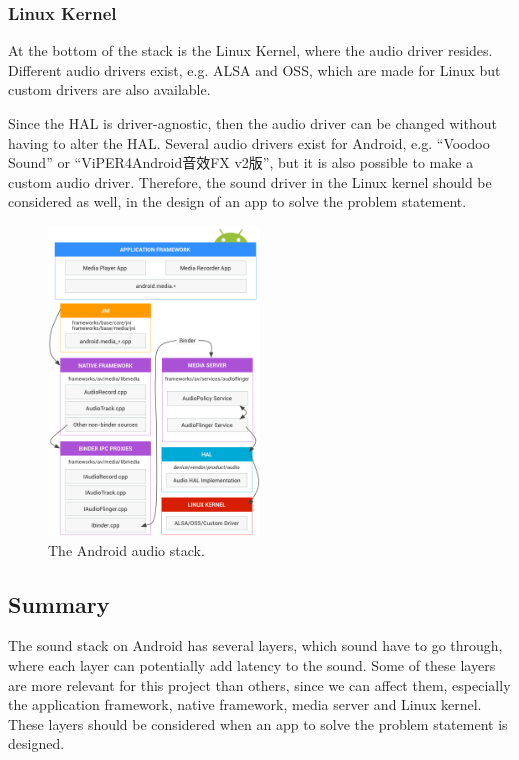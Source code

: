 \subsubsection*{Linux Kernel}
At the bottom of the stack is the Linux Kernel, where the audio driver resides.
Different audio drivers exist, e.g. \ac{ALSA} and \ac{OSS}, which are made for Linux but custom drivers are also available.

Since the \ac{HAL} is driver-agnostic, then the audio driver can be changed without having to alter the \ac{HAL}.
Several audio drivers exist for Android, e.g. ``Voodoo Sound'' or ``ViPER4Android音效FX v2版'',
but it is also possible to make a custom audio driver\cite{voodoo_sound, viper4_android}.
Therefore, the sound driver in the Linux kernel should be considered as well, in the design of an app to solve the problem statement.
\begin{figure}[!bht]
    \centering
    \includegraphics[width=0.5\textwidth]{img/sound_stack.png}
    \caption{The Android audio stack\cite{sound_stack}.}
    \label{fig:sound_stack}
\end{figure}

\subsection{Summary}
The sound stack on Android has several layers, which sound have to go through,
where each layer can potentially add latency to the sound.
Some of these layers are more relevant for this project than others, since we can affect them,
especially the application framework, native framework, media server and Linux kernel.
These layers should be considered when an app to solve the problem statement is designed.


